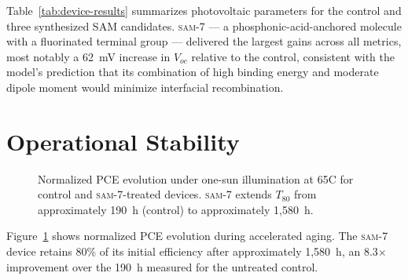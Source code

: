 \documentclass[12pt,a4paper,oneside]{report}
\begin{document}
Table~\ref{tab:device-results} summarizes photovoltaic parameters for the
control and three synthesized SAM candidates. \textsc{sam-7} --- a
phosphonic-acid-anchored molecule with a fluorinated terminal group ---
delivered the largest gains across all metrics, most notably a 62~mV
increase in $V_{oc}$ relative to the control, consistent with the
model's prediction that its combination of high binding energy and
moderate dipole moment would minimize interfacial recombination.

\section{Operational Stability}

\begin{figure}[htbp]
\centering
{}
\caption{Normalized PCE evolution under one-sun illumination at
65\textdegree C for control and \textsc{sam-7}-treated devices.
\textsc{sam-7} extends $T_{80}$ from approximately 190~h (control) to
approximately 1{,}580~h.}
\label{fig:stability}
\end{figure}

Figure~\ref{fig:stability} shows normalized PCE evolution during
accelerated aging. The \textsc{sam-7} device retains 80\% of its initial
efficiency after approximately 1{,}580~h, an 8.3$\times$ improvement over
the 190~h measured for the untreated control.
\end{document}
